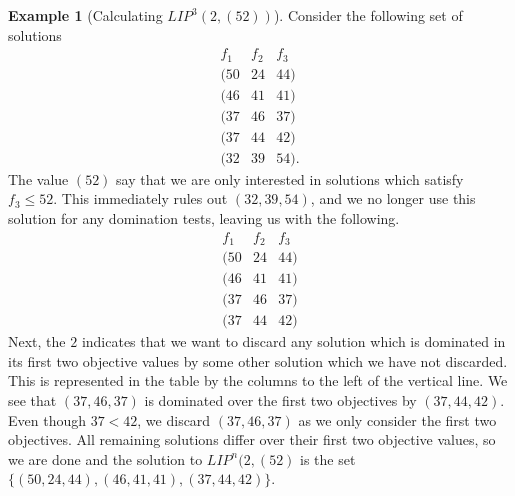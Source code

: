 \documentclass{amsart}
\theoremstyle{definition}
\newtheorem{example}{Example}
\begin{document}
\begin{example}[Calculating ${LI\!P}^3(2, (52))$]\label{ex:lip}
Consider the following set of solutions 
\[
\begin{array}{ccc}
  f_1 & f_2 & f_3 \\ \hline
  (50 & 24 & 44) \\
  (46 & 41 & 41) \\
  (37 & 46 & 37) \\
  (37 & 44 & 42) \\
  (32 & 39 & 54).
\end{array}
\]
The value $(52)$ say that we are only interested in solutions which satisfy $f_3 \leq 52$.
This immediately rules out $(32,39,54)$, and we no longer use this solution for any domination tests, leaving us with the following.
\[
\begin{array}{cc|c}
  f_1 & f_2 & f_3 \\ \hline
  (50 & 24 & 44) \\
  (46 & 41 & 41) \\
  (37 & 46 & 37) \\
  (37 & 44 & 42)
\end{array}
\]
Next, the $2$ indicates that we want to discard any solution which is dominated in its first two objective values by some other solution which we have not discarded.
This is represented in the table by the columns to the left of the vertical line.
We see that $(37, 46, 37)$ is dominated over the first two objectives by $(37, 44, 42)$.
Even though $37 < 42$, we discard $(37, 46, 37)$ as we only consider the first two objectives.
All remaining solutions differ over their first two objective values, so we are done and the solution to ${LI\!P}^n(2, (52)$ is the set $\{ (50, 24, 44), (46,41,41), (37, 44, 42) \}$.
\end{example}
\end{document}
